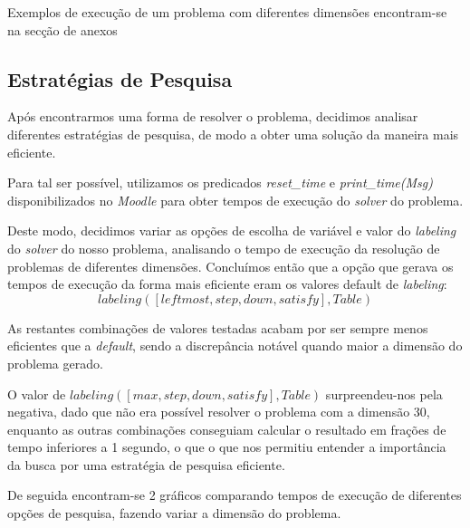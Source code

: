 \documentclass[11pt]{article}
\begin{document}
Exemplos de execução de um problema com diferentes dimensões encontram-se na secção de anexos



\subsection{Estratégias de Pesquisa}

Após encontrarmos uma forma de resolver o problema, decidimos analisar diferentes estratégias de pesquisa, de modo a obter uma solução da maneira mais eficiente.

Para tal ser possível, utilizamos os predicados \emph{reset\_time} e \emph{print\_time(Msg)} disponibilizados no \emph{Moodle} para obter tempos de execução do \emph{solver} do problema.

Deste modo, decidimos variar as opções de escolha de variável e valor do \emph{labeling} do \emph{solver} do nosso problema, analisando o tempo de execução da resolução de problemas de diferentes dimensões.
Concluímos então que a opção que gerava os tempos de execução da forma mais eficiente eram os valores default de \emph{labeling}:  \[labeling([leftmost, step, down, satisfy],Table)\]

As restantes combinações de valores testadas acabam por ser sempre menos eficientes que a \emph{default}, sendo a discrepância notável quando maior a dimensão do problema gerado.

O valor de \(labeling([max, step, down, satisfy],Table)\) surpreendeu-nos pela negativa, dado que não era possível resolver o problema com a dimensão 30, enquanto as outras combinações conseguiam calcular o resultado em frações de tempo inferiores a 1 segundo, o que o que nos permitiu entender a importância da busca por uma estratégia de pesquisa eficiente.

De seguida encontram-se 2 gráficos comparando tempos de execução de diferentes opções de pesquisa, fazendo variar a dimensão do problema.

\bigskip
\end{document}
